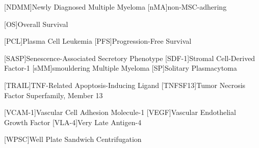 {\begin{spacing}{-.0}
\begin{acronym}
            [NDMM]{Newly Diagnosed Multiple Myeloma}
            [nMA]{non-MSC-adhering}

            [OS]{Overall Survival}

            [PCL]{Plasma Cell Leukemia}
            [PFS]{Progression-Free Survival}

            [SASP]{Senescence-Associated Secretory Phenotype} %
            [SDF-1]{Stromal Cell-Derived Factor-1}
            [sMM]{smouldering Multiple Myeloma}
            [SP]{Solitary Plasmacytoma}
            
            [TRAIL]{TNF-Related Apoptosis-Inducing Ligand}
            [TNFSF13]{Tumor Necrosis Factor Superfamily, Member 13}
            
            [VCAM-1]{Vascular Cell Adhesion Molecule-1}
            [VEGF]{Vascular Endothelial Growth Factor}
            [VLA-4]{Very Late Antigen-4}
            
            [WPSC]{Well Plate Sandwich Centrifugation}


        \end{acronym}
    \end{spacing}
}